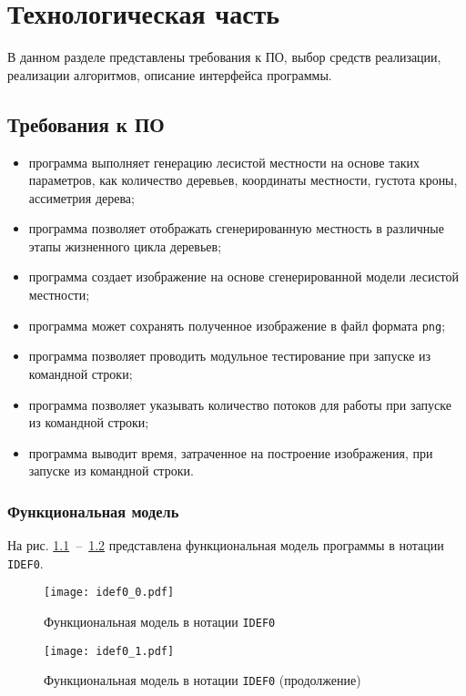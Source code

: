 \chapter{Технологическая часть}

В данном разделе представлены требования к ПО, выбор средств реализации, реализации алгоритмов, описание интерфейса программы.

\section{Требования к ПО}
\begin{itemize}
	\item программа выполняет генерацию лесистой местности на основе таких параметров, как количество деревьев, координаты местности, густота кроны, ассиметрия дерева;
	\item программа позволяет отображать сгенерированную местность в различные этапы жизненного цикла деревьев;
	\item программа создает изображение на основе сгенерированной модели лесистой местности;
	\item программа может сохранять полученное изображение в файл формата \texttt{png};
	\item программа позволяет проводить модульное тестирование при запуске из командной строки;
	\item программа позволяет указывать количество потоков для работы при запуске из командной строки;
	\item программа выводит время, затраченное на построение изображения, при запуске из командной строки.
\end{itemize}

\subsection{Функциональная модель}
На рис. \ref{img:idef0_0}~--~\ref{img:idef0_1} представлена функциональная модель программы в нотации \texttt{IDEF0}.

\noindent
\begin{figure}[h!]
	\centering
    \texttt{[image: idef0\_0.pdf]}
    \caption{Функциональная модель в нотации \texttt{IDEF0}}
    \label{img:idef0_0}
\end{figure}

\noindent
\begin{figure}[h!]
	\centering
    \texttt{[image: idef0\_1.pdf]}
    \caption{Функциональная модель в нотации \texttt{IDEF0} (продолжение)}
    \label{img:idef0_1}
\end{figure}

